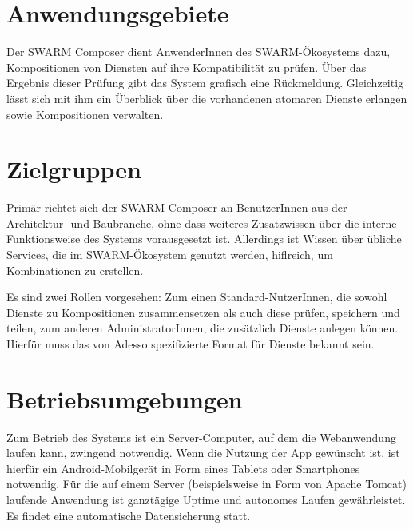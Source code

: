 \section*{Anwendungsgebiete}
Der SWARM Composer dient AnwenderInnen des SWARM-Ökosystems dazu, Kompositionen von Diensten auf ihre Kompatibilität zu prüfen. Über das Ergebnis dieser Prüfung gibt das System grafisch eine Rückmeldung. Gleichzeitig lässt sich mit ihm ein Überblick über die vorhandenen atomaren Dienste erlangen sowie Kompositionen verwalten. 

\section*{Zielgruppen}

Primär richtet sich der SWARM Composer an BenutzerInnen aus der Architektur- und Baubranche, ohne dass weiteres Zusatzwissen über die interne Funktionsweise des Systems vorausgesetzt ist. Allerdings ist Wissen über übliche Services, die im SWARM-Ökosystem genutzt werden, hiflreich, um Kombinationen zu erstellen.

Es sind zwei Rollen vorgesehen: Zum einen Standard-NutzerInnen, die sowohl Dienste zu Kompositionen zusammensetzen als auch diese prüfen, speichern und teilen, zum anderen AdministratorInnen, die zusätzlich Dienste anlegen können. Hierfür muss das von Adesso spezifizierte Format für Dienste bekannt sein.

\section*{Betriebsumgebungen}

Zum Betrieb des Systems ist ein Server-Computer, auf dem die Webanwendung laufen kann, zwingend notwendig. Wenn die Nutzung der App gewünscht ist, ist hierfür ein Android-Mobilgerät in Form eines Tablets oder Smartphones notwendig. Für die auf einem Server (beispielsweise in Form von Apache Tomcat) laufende Anwendung ist ganztägige Uptime und autonomes Laufen gewährleistet. Es findet eine automatische Datensicherung statt.





